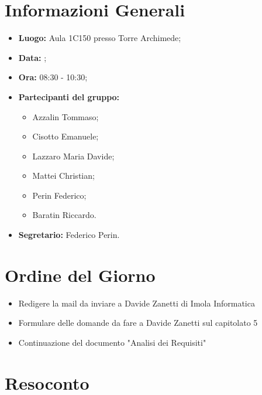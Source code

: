 \section{Informazioni Generali}
\begin{itemize}
\item \textbf{Luogo:} Aula 1C150 presso Torre Archimede;
\item \textbf{Data:} \Data;
\item \textbf{Ora:} 08:30 - 10:30;
\item \textbf{Partecipanti del gruppo:}
	\begin{itemize}
	\item Azzalin Tommaso; 
	\item Cisotto Emanuele;
	\item Lazzaro Maria Davide;
	\item Mattei Christian;
	\item Perin Federico;
	\item Baratin Riccardo.
	\end{itemize} 
\item \textbf{Segretario:} Federico Perin.
\end{itemize}

\clearpage

\section{Ordine del Giorno}
\begin{itemize}
\item Redigere la mail da inviare a Davide Zanetti di Imola Informatica
\item Formulare delle domande da fare a Davide Zanetti sul capitolato 5
\item Continuazione del documento "Analisi dei Requisiti"
\end{itemize}

\section{Resoconto}
